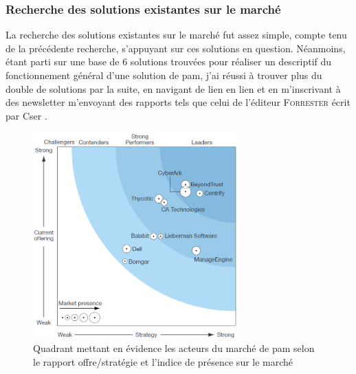 \subsubsection{Recherche des solutions existantes sur le marché}
\label{par:sol_market}
La recherche des solutions existantes sur le marché fut assez simple, compte tenu de la précédente recherche, s'appuyant sur ces solutions en question. Néanmoins, étant parti sur une base de 6 solutions trouvées pour réaliser un descriptif du fonctionnement général d'une solution de \gls{pam}, j'ai réussi à trouver plus du double de solutions par la suite, en navigant de lien en lien et en m'inscrivant à des newsletter m'envoyant des rapports tels que celui de l'éditeur \textsc{Forrester} écrit par Cser \cite{acs}.

\begin{figure}[!ht]
    \center
    \includegraphics[width=0.7\textwidth]{./images/forrester_quadrant.png}
    \caption{Quadrant mettant en évidence les acteurs du marché de \gls{pam} selon le rapport offre/stratégie et l'indice de présence sur le marché}
\end{figure}

